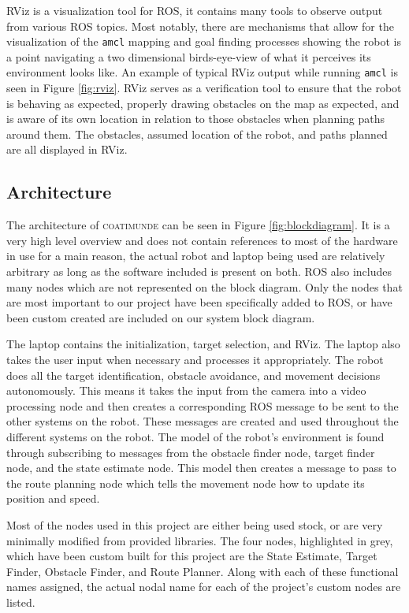 \documentclass{article}[12]
\begin{document}
	RViz is a visualization tool for ROS, it contains many tools to observe output from various ROS topics. Most notably, there are mechanisms that allow for the visualization of the \texttt{amcl} mapping and goal finding processes showing the robot is a point navigating a two dimensional birds-eye-view of what it perceives its environment looks like. An example of typical RViz output while running \texttt{amcl} is seen in Figure \ref{fig:rviz}. RViz serves as a verification tool to ensure that the robot is behaving as expected, properly drawing obstacles on the map as expected, and is aware of its own location in relation to those obstacles when planning paths around them. The obstacles, assumed location of the robot, and paths planned are all displayed in RViz.

	\subsection{Architecture}
	
	The architecture of \textsc{coatimunde} can be seen in Figure \ref{fig:blockdiagram}. It is a very high level overview and does not contain references to most of the hardware in use for a main reason, the actual robot and laptop being used are relatively arbitrary as long as the software included is present on both. ROS also includes many nodes which are not represented on the block diagram. Only the nodes that are most important to our project have been specifically added to ROS, or have been custom created are included on our system block diagram.
	
	The laptop contains the initialization, target selection, and RViz. The laptop also takes the user input when necessary and processes it appropriately.  The robot does all the target identification, obstacle avoidance, and movement decisions autonomously. This means it takes the input from the camera into a video processing node and then creates a corresponding ROS message to be sent to the other systems on the robot. These messages are created and used throughout the different systems on the robot. The model of the robot's environment is found through subscribing to messages from the obstacle finder node, target finder node, and the state estimate node. This model then creates a message to pass to the route planning node which tells the movement node how to update its position and speed. 
	
	Most of the nodes used in this project are either being used stock, or are very minimally modified from provided libraries. The four nodes, highlighted in grey, which have been custom built for this project are the State Estimate, Target Finder, Obstacle Finder, and Route Planner. Along with each of these functional names assigned, the actual nodal name for each of the project's custom nodes are listed.
\end{document}
